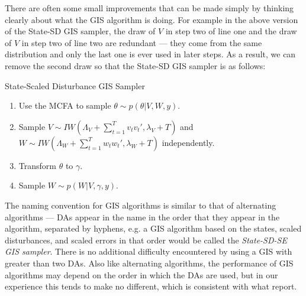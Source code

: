 \documentclass[12pt]{article}
\begin{document}
There are often some small improvements that can be made simply by thinking clearly about what the GIS algorithm is doing. For example in the above version of the State-SD GIS sampler, the draw of $V$ in step two of line one and the draw of $V$ in step two of line two are redundant --- they come from the same distribution and only the last one is ever used in later steps. As a result, we can remove the second draw so that the State-SD GIS sampler is as follows:
\begin{alg*}State-Scaled Disturbance GIS Sampler
\label{alg:DLMstateerror}
\begin{enumerate}
\item Use the MCFA to sample $\theta \sim p(\theta|V,W,y)$.
\item Sample $V \sim IW\left(\Lambda_V + \sum_{t=1}^Tv_tv_t',\lambda_V + T\right)$ and $W \sim IW\left(\Lambda_W + \sum_{t=1}^Tw_tw_t',\lambda_{W} + T\right)$ independently.
\item Transform $\theta$ to $\gamma$.
\item Sample $W \sim p(W|V,\gamma,y)$.
\end{enumerate}
\end{alg*}\noindent

The naming convention for GIS algorithms is similar to that of alternating algorithms --- DAs appear in the name in the order that they appear in the algorithm, separated by hyphens, e.g. a GIS algorithm based on the states, scaled disturbances, and scaled errors in that order would be called the {\it State-SD-SE GIS sampler}. There is no additional difficulty encountered by using a GIS with greater than two DAs. Also like alternating algorithms, the performance of GIS algorithms may depend on the order in which the DAs are used, but in our experience this tends to make no different, which is consistent with what \citet{yu2011center} report.
\end{document}
